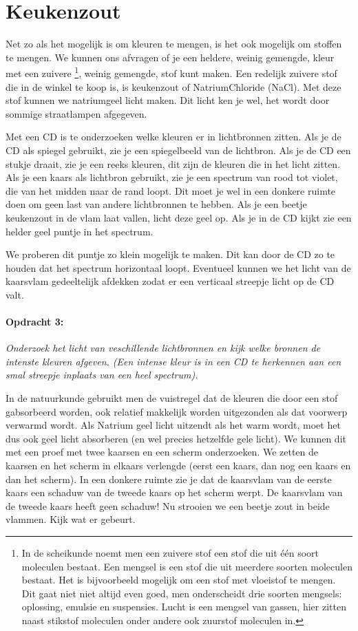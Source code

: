 \section{Keukenzout}

Net zo als het mogelijk is om kleuren te mengen, is het ook mogelijk om
stoffen te mengen. We kunnen ons afvragen of je een heldere, weinig
gemengde, kleur met een zuivere \footnote{In de scheikunde noemt men een
zuivere stof een stof die uit één soort moleculen bestaat. Een mengsel
is een stof die uit meerdere soorten moleculen bestaat. Het is
bijvoorbeeld mogelijk om een stof met vloeistof te mengen. Dit gaat niet
niet altijd even goed, men onderscheidt drie soorten mengsels:
oplossing, emulsie en suspensies. Lucht is een mengsel van gassen, hier
zitten naast stikstof moleculen onder andere ook zuurstof moleculen in.
}, weinig gemengde, stof kunt maken. Een redelijk zuivere stof die in de
winkel te koop is, is keukenzout of NatriumChloride (NaCl). Met deze
stof kunnen we natriumgeel licht maken. Dit licht ken je wel, het wordt
door sommige straatlampen afgegeven.

Met een CD is te onderzoeken welke kleuren er in lichtbronnen zitten.
Als je de CD als spiegel gebruikt, zie je een spiegelbeeld van de
lichtbron. Als je de CD een stukje draait, zie je een reeks kleuren,
dit zijn de kleuren die in het licht zitten. Als je een kaars als
lichtbron gebruikt, zie je een spectrum van rood tot violet, die van
het midden naar de rand loopt. Dit moet je wel in een donkere ruimte
doen om geen last van andere lichtbronnen te hebben. Als je een beetje
keukenzout in de vlam laat vallen, licht deze geel op. Als je in de
CD kijkt zie een helder geel puntje in het spectrum. 

We proberen dit puntje zo klein mogelijk te maken. Dit kan door de
CD zo te houden dat het spectrum horizontaal loopt. Eventueel kunnen
we het licht van de kaarsvlam gedeeltelijk afdekken zodat er een verticaal
streepje licht op de CD valt.


\paragraph*{Opdracht 3:}

\emph{Onderzoek het licht van veschillende lichtbronnen en kijk welke
bronnen de intenste kleuren afgeven. (Een intense kleur is in een
CD te herkennen aan een smal streepje inplaats van een heel spectrum).}

In de natuurkunde gebruikt men de vuistregel dat de kleuren die door
een stof gabsorbeerd worden, ook relatief makkelijk worden uitgezonden
als dat voorwerp verwarmd wordt. Als Natrium geel licht uitzendt als
het warm wordt, moet het dus ook geel licht absorberen (en wel precies
hetzelfde gele licht). We kunnen dit met een proef met twee kaarsen
en een scherm onderzoeken. We zetten de kaarsen en het scherm in elkaars
verlengde (eerst een kaars, dan nog een kaars en dan het scherm).
In een donkere ruimte zie je dat de kaarsvlam van de eerste kaars
een schaduw van de tweede kaars op het scherm werpt. De kaarsvlam
van de tweede kaars heeft geen schaduw! Nu strooien we een beetje
zout in beide vlammen. Kijk wat er gebeurt.



